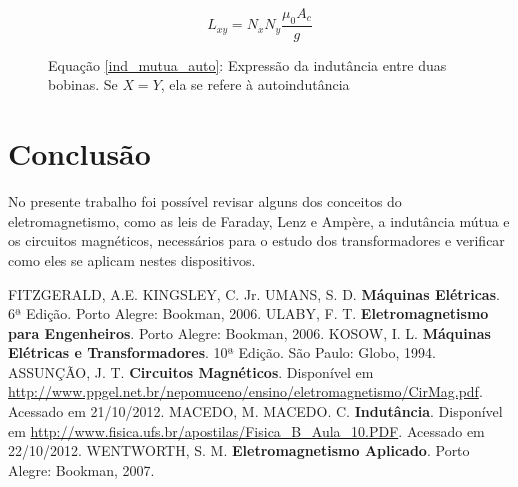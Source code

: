 \documentclass[]{report}
\begin{document}
\begin{figure}
\begin{equation}
\label{ind_mutua_auto}
L_{xy}  = N_x N_y \frac{\mu_0 A_c}{g}
\end{equation}
\caption*{Equação \ref{ind_mutua_auto}: Expressão da indutância entre duas bobinas. Se $X=Y$, ela se refere à autoindutância}
\end{figure}

\chapter{Conclusão}
No presente trabalho foi possível revisar alguns dos conceitos do eletromagnetismo, como as leis de Faraday, Lenz e Ampère, a indutância mútua e os circuitos magnéticos, necessários para o estudo dos transformadores e verificar como eles se aplicam nestes dispositivos. 


\begin{thebibliography}{100}
 FITZGERALD, A.E. KINGSLEY, C. Jr. UMANS, S. D. \textbf{Máquinas Elétricas}. 6ª Edição. Porto Alegre: Bookman, 2006.
 ULABY, F. T. \textbf{Eletromagnetismo para Engenheiros}. Porto Alegre: Bookman, 2006.
 KOSOW, I. L. \textbf{Máquinas Elétricas e Transformadores}. 10ª Edição. São Paulo: Globo, 1994.
 ASSUNÇÃO, J. T. \textbf{Circuitos Magnéticos}. Disponível em \url{http://www.ppgel.net.br/nepomuceno/ensino/eletromagnetismo/CirMag.pdf}. Acessado em 21/10/2012.
 MACEDO, M. MACEDO. C. \textbf{Indutância}. Disponível em \url{http://www.fisica.ufs.br/apostilas/Fisica_B_Aula_10.PDF}. Acessado em 22/10/2012.
 WENTWORTH, S. M. \textbf{Eletromagnetismo Aplicado}. Porto Alegre: Bookman, 2007.
\end{thebibliography}
\end{document}
